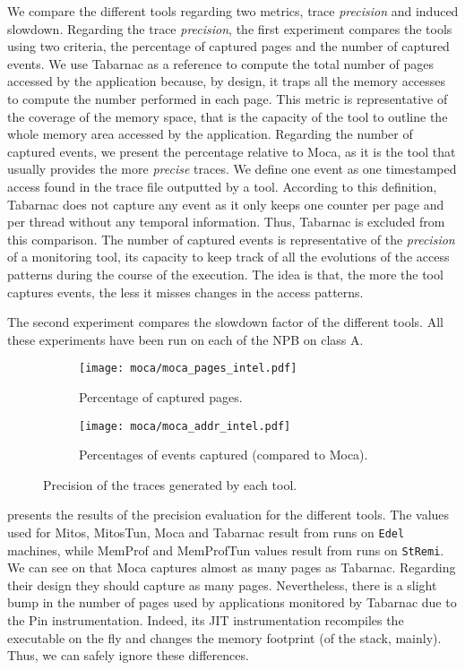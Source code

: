 We compare the different tools regarding two metrics, trace \emph{precision} and induced slowdown.
Regarding the trace \emph{precision}, the first experiment compares the tools using two criteria, the percentage of captured pages and the number of captured events.
We use \gls{Tabarnac} as a reference to compute the total number of pages accessed by the application because, by design, it traps all the memory accesses to compute the number performed in each page.
This metric is representative of the coverage of the memory space, that is the capacity of the tool to outline the whole memory area accessed by the application.
Regarding the number of captured events, we present the percentage relative to \gls{Moca}, as it is the tool that usually provides the more \emph{precise} traces.
We define one event as one timestamped access found in the trace file outputted by a tool.
According to this definition, \gls{Tabarnac} does not capture any event as it only keeps one counter per page and per thread without any temporal information.
Thus, \gls{Tabarnac} is excluded from this comparison.
The number of captured events is representative of the \emph{precision} of a monitoring tool, its capacity to keep track of all the evolutions of the access patterns during the course of the execution.
The idea is that, the more the tool captures events, the less it misses changes in the access patterns.

The second experiment compares the slowdown factor of the different tools.
All these experiments have been run on each of the \gls{NPB} on class A.

\begin{figure}[htb]
    \centering
    \begin{subfigure}{.7\linewidth}
        \texttt{[image: moca/moca\_pages\_intel.pdf]}
        \caption{Percentage of captured pages.}
        \label{fig:pages}
    \end{subfigure}
    \begin{subfigure}{.7\linewidth}
        \texttt{[image: moca/moca\_addr\_intel.pdf]}
        \caption{Percentages of events captured (compared to \gls{Moca}).}
        \label{fig:addr}
    \end{subfigure}
    \caption{Precision of the traces generated by each tool.}
    \label{fig:pages-addr}
\end{figure}

 presents the results of the precision evaluation for the different tools.
The values used for \gls{Mitos}, MitosTun, \gls{Moca} and \gls{Tabarnac} result from runs on \texttt{Edel} machines, while \gls{MemProf} and MemProfTun values result from runs on \texttt{StRemi}.
We can see on  that \gls{Moca} captures almost as many pages as \gls{Tabarnac}.
Regarding their design they should capture as many pages.
Nevertheless, there is a slight bump in the number of pages used by applications monitored by \gls{Tabarnac} due to the Pin instrumentation.
Indeed, its JIT instrumentation recompiles the executable on the fly and changes the memory footprint (of the stack, mainly).
Thus, we can safely ignore these differences.

